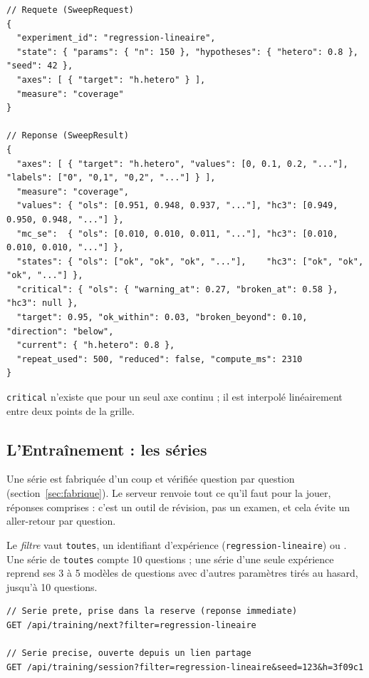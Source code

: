 \documentclass[11pt,a4paper]{article}
\begin{document}
\begin{appendices}
\begin{lstlisting}[caption={Requête et réponse de \texttt{POST /api/sweep}.}]
// Requete (SweepRequest)
{
  "experiment_id": "regression-lineaire",
  "state": { "params": { "n": 150 }, "hypotheses": { "hetero": 0.8 }, "seed": 42 },
  "axes": [ { "target": "h.hetero" } ],
  "measure": "coverage"
}

// Reponse (SweepResult)
{
  "axes": [ { "target": "h.hetero", "values": [0, 0.1, 0.2, "..."], "labels": ["0", "0,1", "0,2", "..."] } ],
  "measure": "coverage",
  "values": { "ols": [0.951, 0.948, 0.937, "..."], "hc3": [0.949, 0.950, 0.948, "..."] },
  "mc_se":  { "ols": [0.010, 0.010, 0.011, "..."], "hc3": [0.010, 0.010, 0.010, "..."] },
  "states": { "ols": ["ok", "ok", "ok", "..."],    "hc3": ["ok", "ok", "ok", "..."] },
  "critical": { "ols": { "warning_at": 0.27, "broken_at": 0.58 }, "hc3": null },
  "target": 0.95, "ok_within": 0.03, "broken_beyond": 0.10, "direction": "below",
  "current": { "h.hetero": 0.8 },
  "repeat_used": 500, "reduced": false, "compute_ms": 2310
}
\end{lstlisting}

\texttt{critical} n'existe que pour un seul axe continu ; il est interpolé linéairement entre deux points de la grille.

\subsection{L'Entraînement : les séries}\label{ann:api-training}
Une série est fabriquée d'un coup et vérifiée question par question (section~\ref{sec:fabrique}). Le serveur renvoie tout ce qu'il faut pour la jouer, réponses comprises : c'est un outil de révision, pas un examen, et cela évite un aller-retour par question.

Le \emph{filtre} vaut \texttt{toutes}, un identifiant d'expérience (\texttt{regression-lineaire}) ou . Une série de \texttt{toutes} compte 10 questions ; une série d'une seule expérience reprend ses 3 à 5 modèles de questions avec d'autres paramètres tirés au hasard, jusqu'à 10 questions.

\begin{lstlisting}[caption={Les deux routes de l'Entraînement et leur réponse commune.}]
// Serie prete, prise dans la reserve (reponse immediate)
GET /api/training/next?filter=regression-lineaire

// Serie precise, ouverte depuis un lien partage
GET /api/training/session?filter=regression-lineaire&seed=123&h=3f09c1


\end{lstlisting}
\end{appendices}
\end{document}
